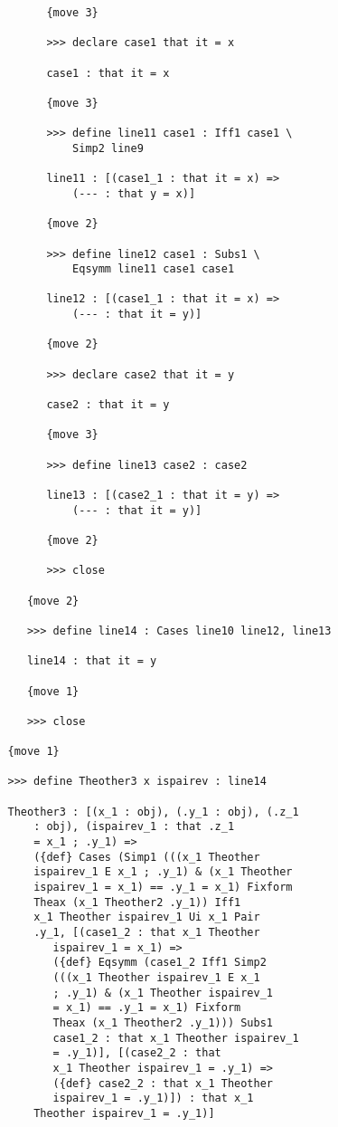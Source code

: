 \documentclass[12pt]{article}
\begin{document}
\begin{verbatim}
         {move 3}

         >>> declare case1 that it = x

         case1 : that it = x

         {move 3}

         >>> define line11 case1 : Iff1 case1 \
             Simp2 line9

         line11 : [(case1_1 : that it = x) => 
             (--- : that y = x)]

         {move 2}

         >>> define line12 case1 : Subs1 \
             Eqsymm line11 case1 case1

         line12 : [(case1_1 : that it = x) => 
             (--- : that it = y)]

         {move 2}

         >>> declare case2 that it = y

         case2 : that it = y

         {move 3}

         >>> define line13 case2 : case2

         line13 : [(case2_1 : that it = y) => 
             (--- : that it = y)]

         {move 2}

         >>> close

      {move 2}

      >>> define line14 : Cases line10 line12, line13

      line14 : that it = y

      {move 1}

      >>> close

   {move 1}

   >>> define Theother3 x ispairev : line14

   Theother3 : [(x_1 : obj), (.y_1 : obj), (.z_1 
       : obj), (ispairev_1 : that .z_1 
       = x_1 ; .y_1) => 
       ({def} Cases (Simp1 (((x_1 Theother 
       ispairev_1 E x_1 ; .y_1) & (x_1 Theother 
       ispairev_1 = x_1) == .y_1 = x_1) Fixform 
       Theax (x_1 Theother2 .y_1)) Iff1 
       x_1 Theother ispairev_1 Ui x_1 Pair 
       .y_1, [(case1_2 : that x_1 Theother 
          ispairev_1 = x_1) => 
          ({def} Eqsymm (case1_2 Iff1 Simp2 
          (((x_1 Theother ispairev_1 E x_1 
          ; .y_1) & (x_1 Theother ispairev_1 
          = x_1) == .y_1 = x_1) Fixform 
          Theax (x_1 Theother2 .y_1))) Subs1 
          case1_2 : that x_1 Theother ispairev_1 
          = .y_1)], [(case2_2 : that 
          x_1 Theother ispairev_1 = .y_1) => 
          ({def} case2_2 : that x_1 Theother 
          ispairev_1 = .y_1)]) : that x_1 
       Theother ispairev_1 = .y_1)]


\end{verbatim}
\end{document}
